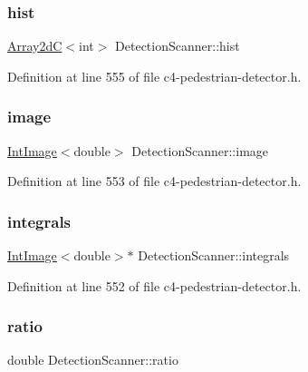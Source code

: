 \subsubsection{\texorpdfstring{hist}{hist}}
{\footnotesize\ttfamily \mbox{\hyperlink{class_array2d_c}{Array2dC}}$<$int$>$ Detection\+Scanner\+::hist\hspace{0.3cm}{\ttfamily [private]}}



Definition at line 555 of file c4-\/pedestrian-\/detector.\+h.

\mbox{\label{class_detection_scanner_aa4e4cfa6cc0a2ffd044c6cd9721a6b59}} 
\subsubsection{\texorpdfstring{image}{image}}
{\footnotesize\ttfamily \mbox{\hyperlink{class_int_image}{Int\+Image}}$<$double$>$ Detection\+Scanner\+::image\hspace{0.3cm}{\ttfamily [private]}}



Definition at line 553 of file c4-\/pedestrian-\/detector.\+h.

\mbox{\label{class_detection_scanner_a0f64092660cd084b8a1d3b6e8e30cabb}} 
\subsubsection{\texorpdfstring{integrals}{integrals}}
{\footnotesize\ttfamily \mbox{\hyperlink{class_int_image}{Int\+Image}}$<$double$>$$\ast$ Detection\+Scanner\+::integrals\hspace{0.3cm}{\ttfamily [private]}}



Definition at line 552 of file c4-\/pedestrian-\/detector.\+h.

\mbox{\label{class_detection_scanner_a2ac93d1b6aca1959d57133c08b0eaa1c}} 
\subsubsection{\texorpdfstring{ratio}{ratio}}
{\footnotesize\ttfamily double Detection\+Scanner\+::ratio}



